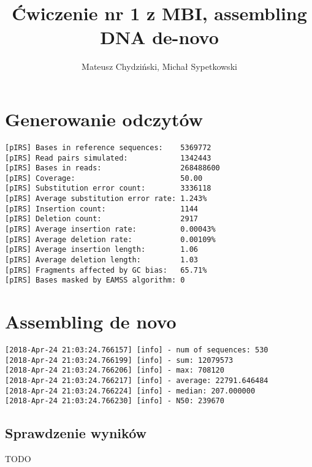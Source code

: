 \documentclass[a4paper]{article}
\begin{document}
\title{Ćwiczenie nr 1 z MBI, assembling DNA de-novo}
\author{Mateusz Chydziński, Michał Sypetkowski}
\maketitle


\section{Generowanie odczytów}
\begin{verbatim}
[pIRS] Bases in reference sequences:    5369772
[pIRS] Read pairs simulated:            1342443
[pIRS] Bases in reads:                  268488600
[pIRS] Coverage:                        50.00
[pIRS] Substitution error count:        3336118
[pIRS] Average substitution error rate: 1.243%
[pIRS] Insertion count:                 1144
[pIRS] Deletion count:                  2917
[pIRS] Average insertion rate:          0.00043%
[pIRS] Average deletion rate:           0.00109%
[pIRS] Average insertion length:        1.06
[pIRS] Average deletion length:         1.03
[pIRS] Fragments affected by GC bias:   65.71%
[pIRS] Bases masked by EAMSS algorithm: 0
\end{verbatim}

\section{Assembling de novo}

\begin{verbatim}
[2018-Apr-24 21:03:24.766157] [info] - num of sequences: 530
[2018-Apr-24 21:03:24.766199] [info] - sum: 12079573
[2018-Apr-24 21:03:24.766206] [info] - max: 708120
[2018-Apr-24 21:03:24.766217] [info] - average: 22791.646484
[2018-Apr-24 21:03:24.766224] [info] - median: 207.000000
[2018-Apr-24 21:03:24.766230] [info] - N50: 239670
\end{verbatim}


\subsection {Sprawdzenie wyników}
TODO
\end{document}
